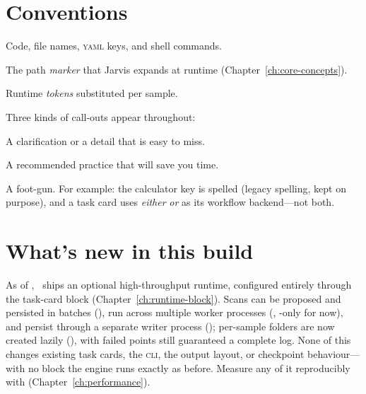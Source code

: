 \section*{Conventions}

\begin{description}[style=nextline, leftmargin=1.2em]
  \item[\code{monospace}] Code, file names, \textsc{yaml} keys, and shell commands.
  \item[\marker{\&J/}] The path \emph{marker} that Jarvis expands at runtime
        (Chapter~\ref{ch:core-concepts}).
  \item[\token{@SampleID}, \token{@Sdir}, \token{@PackID}] Runtime \emph{tokens} substituted
        per sample.
\end{description}

\noindent Three kinds of call-outs appear throughout:

\begin{jnote}
A clarification or a detail that is easy to miss.
\end{jnote}

\begin{jtip}
A recommended practice that will save you time.
\end{jtip}

\begin{jwarn}
A foot-gun. For example: the calculator key is spelled 
(legacy spelling, kept on purpose), and a task card uses \emph{either} 
\emph{or}  as its workflow backend---not both.
\end{jwarn}

\section*{What's new in this build}

As of \Jversion, \Jarvis\ ships an optional high-throughput runtime, configured entirely through the
 task-card block (Chapter~\ref{ch:runtime-block}). Scans can be proposed and
persisted in batches (), run across multiple worker processes
(, -only for now), and persist through a separate writer
process (); per-sample folders are now created lazily
(), with failed points still guaranteed a complete log. None of this
changes existing task cards, the \textsc{cli}, the output layout, or checkpoint behaviour---with no
 block the engine runs exactly as before. Measure any of it reproducibly with
 (Chapter~\ref{ch:performance}).

